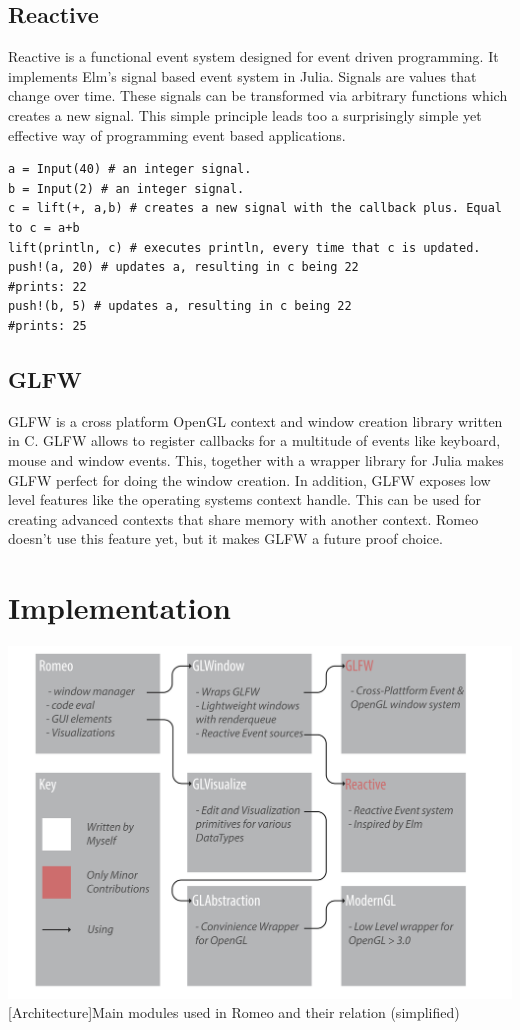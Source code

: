 \subsection{Reactive}
Reactive is a functional event system designed for event driven programming.
It implements Elm's signal based event system in Julia.
Signals are values that change over time.
These signals can be transformed via arbitrary functions which creates a new signal. 
This simple principle leads too a surprisingly simple yet effective way of programming event based applications.
\begin{lstlisting}
a = Input(40) # an integer signal.
b = Input(2) # an integer signal.
c = lift(+, a,b) # creates a new signal with the callback plus. Equal to c = a+b
lift(println, c) # executes println, every time that c is updated. 
push!(a, 20) # updates a, resulting in c being 22
#prints: 22
push!(b, 5) # updates a, resulting in c being 22
#prints: 25
\end{lstlisting}

\subsection{GLFW}
GLFW is a cross platform \ac{OpenGL} context and window creation library written in C.
GLFW allows to register callbacks for a multitude of events like keyboard, mouse and window events.
This, together with a wrapper library for Julia makes GLFW perfect for doing the window creation.
In addition, GLFW exposes low level features like the operating systems context handle.
This can be used for creating advanced contexts that share memory with another context.
Romeo doesn't use this feature yet, but it makes GLFW a future proof choice.


\section{Implementation}


\vspace{1em}
\begin{minipage}{\linewidth}
    \centering
    \includegraphics[width=0.9\linewidth]{graphics/architecture.pdf}
    [Architecture]{Main modules used in Romeo and their relation (simplified)}
    \label{fig:architecture} 
\end{minipage}


